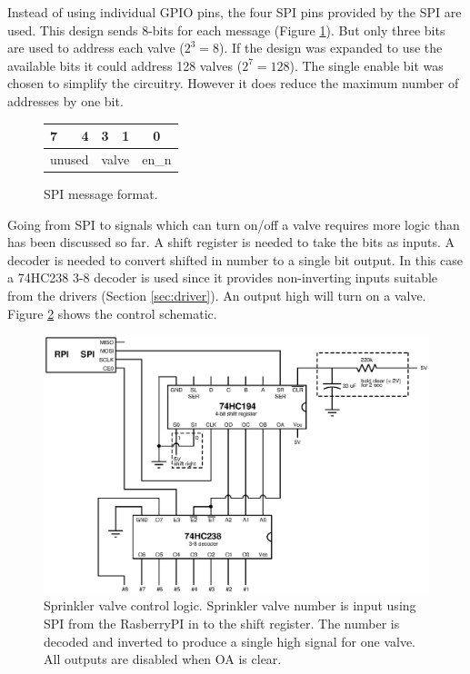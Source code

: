 \documentclass{article}
\begin{document}
Instead of using individual GPIO pins, the four SPI pins provided by
the SPI are used.
This design sends 8-bits for each message (Figure \ref{fig:spi}).
But only three bits are used to address each valve ($2^3 = 8$).
If the design was expanded to use the available bits
it could address 128 valves ($2^7 = 128$).
The single enable bit was chosen to simplify the circuitry.
However it does reduce the maximum number of addresses by one bit.

{
\renewcommand*\arraystretch{1.5}
\begin{figure}[hbp]

\centering
\begin{tabular}{l r l r l r }
7 & 4 & 3 & 1 & \multicolumn{2}{c}{0} \\
\hline
\multicolumn{2}{|c|}{\hspace*{6mm} unused \hspace*{6mm}} &
\multicolumn{2}{|c|}{\hspace*{4mm} valve \hspace*{4mm}} &
\multicolumn{2}{|c|}{\hspace*{1mm} en\_n \hspace*{1mm}} \\
\hline
\end{tabular}

\caption{SPI message format.}
\label{fig:spi}
\end{figure}
}

Going from SPI to signals which can turn on/off a valve requires
more logic than has been discussed so far.
A shift register is needed to take the bits as inputs.
A decoder is needed to convert shifted in number to a single
bit output.
In this case a 74HC238 3-8 decoder is used since it provides non-inverting
inputs suitable from the drivers (Section \ref{sec:driver}).
An output high will turn on a valve.
Figure \ref{fig:control} shows the control schematic.

\begin{figure}[hbp]
\includegraphics[scale=0.90]{xcircuit/control}
\caption{Sprinkler valve control logic.
Sprinkler valve number is input using SPI from the RasberryPI in
to the shift register.  The number is decoded and inverted to produce
a single high signal for one valve.
All outputs are disabled when OA is clear.}\label{fig:control}
\end{figure}
\end{document}

